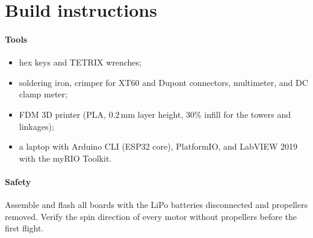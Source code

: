\section{Build instructions}
\label{sec:build}

\paragraph{Tools}
\begin{itemize}
  \item hex keys and TETRIX wrenches;
  \item soldering iron, crimper for XT60 and Dupont connectors, multimeter, and DC clamp meter;
  \item FDM 3D printer (PLA, 0.2\,mm layer height, 30\% infill for the towers and linkages);
  \item a laptop with Arduino CLI (ESP32 core), PlatformIO, and LabVIEW 2019 with the myRIO Toolkit.
\end{itemize}

\paragraph{Safety}
Assemble and flash all boards with the LiPo batteries disconnected and propellers removed. Verify the spin direction of every motor without propellers before the first flight.

